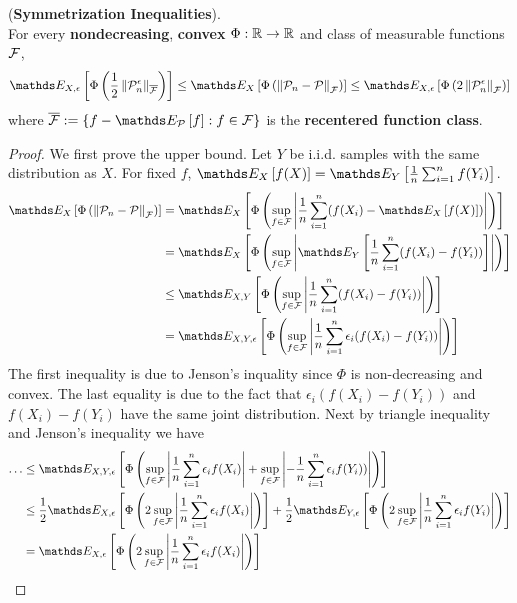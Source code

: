 \documentclass[11pt]{article}
\begin{document}
\begin{itemize}
\begin{proposition} (\textbf{Symmetrization Inequalities}). \citep{wellner2013weak, boucheron2013concentration, vershynin2018high, wainwright2019high}\\
For every \textbf{nondecreasing}, \textbf{convex} $\Phi: {\mathbb R} \to {\mathbb R}$ and class of measurable functions ${\mathcal F}$,
\begin{align}
\E{X, \epsilon}{\Phi\paren{\frac{1}{2}\norm{\cP_n^{\epsilon}}{\overline{\cF}}}} \le \E{X}{\Phi\paren{\norm{\cP_n - \cP}{\cF}}} \le \E{X, \epsilon}{\Phi\paren{2\norm{\cP_n^{\epsilon}}{\cF}}} \label{ineqn: symmetrization_inequality}
\end{align} where $\overline{\cF} := \set{f - \E{\cP}{f}: f\in \cF}$ is the \textbf{recentered function class}.
\end{proposition}
\begin{proof}
We first prove the upper bound. Let $Y$ be i.i.d. samples with the same distribution as $X$. For fixed $f$, $\E{X}{f(X)} = \E{Y}{\frac{1}{n}\sum_{i=1}^nf(Y_i)}$.
\begin{align*}
\E{X}{\Phi\paren{\norm{\cP_n - \cP}{\cF}}} &= \E{X}{\Phi\paren{\sup_{f\in \cF}\abs{\frac{1}{n}\sum_{i=1}^n (f(X_i) - \E{X}{f(X)})}}}\\
&= \E{X}{\Phi\paren{\sup_{f\in \cF}\abs{\E{Y}{\frac{1}{n}\sum_{i=1}^n (f(X_i) - f(Y_i))}}}}\\
&\le \E{X, Y}{\Phi\paren{\sup_{f\in \cF}\abs{\frac{1}{n}\sum_{i=1}^n (f(X_i) - f(Y_i))} }}\\
&= \E{X, Y, \epsilon}{\Phi\paren{\sup_{f\in \cF}\abs{ \frac{1}{n}\sum_{i=1}^n \epsilon_i (f(X_i) - f(Y_i))}}}
\end{align*} The first inequality is due to Jenson's inquality since $\Phi$ is non-decreasing and convex. The last equality is due to the fact that $\epsilon_i(f(X_i) - f(Y_i))$ and $f(X_i) - f(Y_i)$ have the same joint distribution. Next by triangle inequality and Jenson's inequality  we have
\begin{align*}
\ldots & \le \E{X, Y, \epsilon}{\Phi\paren{\sup_{f\in \cF}\abs{ \frac{1}{n}\sum_{i=1}^n \epsilon_i f(X_i)} +\sup_{f\in \cF} \abs{- \frac{1}{n}\sum_{i=1}^n \epsilon_i f(Y_i))}}}\\
&\le  \frac{1}{2}\E{X, \epsilon}{\Phi\paren{2\sup_{f\in \cF}\abs{ \frac{1}{n}\sum_{i=1}^n \epsilon_i f(X_i) }}} +   \frac{1}{2}\E{Y, \epsilon}{\Phi\paren{2\sup_{f\in \cF}\abs{ \frac{1}{n}\sum_{i=1}^n \epsilon_i f(Y_i)}}} \\
&= \E{X, \epsilon}{\Phi\paren{2\sup_{f\in \cF}\abs{ \frac{1}{n}\sum_{i=1}^n \epsilon_i f(X_i) }}}

\end{align*}
\end{proof}
\end{itemize}
\end{document}

